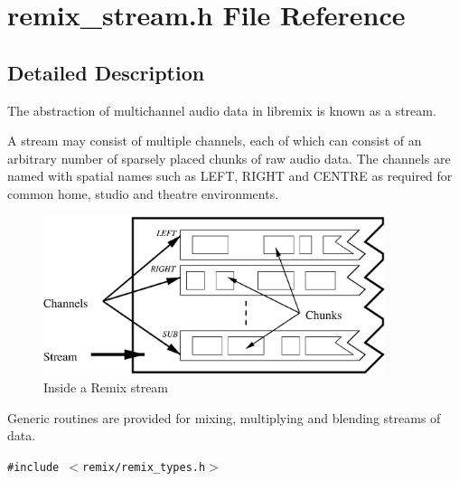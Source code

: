 \section{remix\_\-stream.h File Reference}
\label{remix__stream_8h}


\subsection{Detailed Description}
The abstraction of multichannel audio data in libremix is known as a stream. 

A stream may consist of multiple channels, each of which can consist of an arbitrary number of sparsely placed chunks of raw audio data. The channels are named with spatial names such as LEFT, RIGHT and CENTRE as required for common home, studio and theatre environments.

\begin{figure}[H]
\begin{center}
\includegraphics[width=10cm]{streams}\caption{Inside a Remix stream}
\end{center}
\end{figure}


Generic routines are provided for mixing, multiplying and blending streams of data.

{\tt \#include $<$remix/remix\_\-types.h$>$}\par
